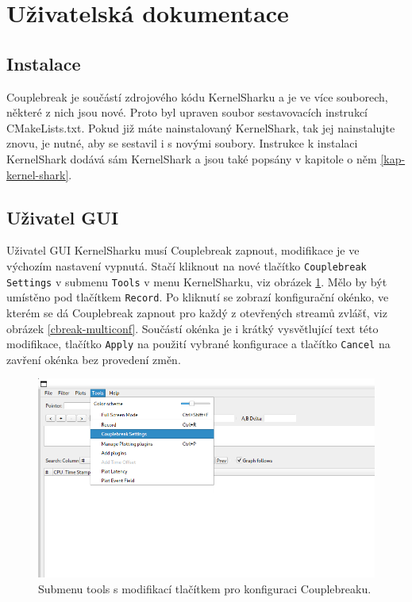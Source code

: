 \section{Uživatelská dokumentace}

\subsection{Instalace}
Couplebreak je součástí zdrojového kódu KernelSharku a je ve více souborech, některé z nich jsou nové. Proto byl upraven soubor sestavovacích instrukcí CMakeLists.txt. Pokud již máte nainstalovaný KernelShark, tak jej nainstalujte znovu, je nutné, aby se sestavil i s novými soubory. Instrukce k instalaci KernelShark dodává sám KernelShark a jsou také popsány v kapitole o něm \ref{kap-kernel-shark}.

\subsection{Uživatel GUI}

Uživatel GUI KernelSharku musí Couplebreak zapnout, modifikace je ve výchozím nastavení vypnutá. Stačí kliknout na nové tlačítko \texttt{Couplebreak Settings} v submenu \texttt{Tools} v menu KernelSharku, viz obrázek \ref{cbreak-tools}. Mělo by být umístěno pod tlačítkem \texttt{Record}. Po kliknutí se zobrazí konfigurační okénko, ve kterém se dá Couplebreak zapnout pro každý z otevřených streamů zvlášť, viz obrázek \ref{cbreak-multiconf}. Součástí okénka je i krátký vysvětlující text této modifikace, tlačítko \texttt{Apply} na použití vybrané konfigurace a tlačítko \texttt{Cancel} na zavření okénka bez provedení změn.

\begin{figure}[p]\centering
    \includegraphics[width=140mm]{img/Modifikace/modif-couplebreak-tools}
    \caption{Submenu tools s modifikací tlačítkem pro konfiguraci Couplebreaku.}
    \label{cbreak-tools}
\end{figure}

